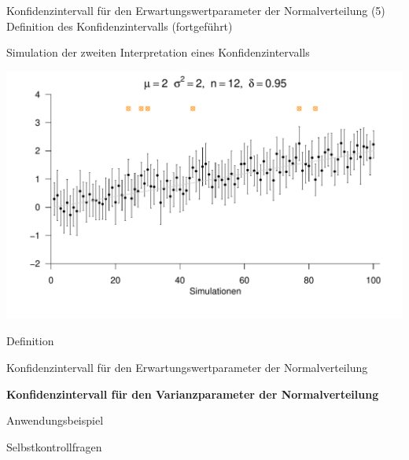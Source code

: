\documentclass[
  8pt,
  ignorenonframetext,
]{beamer}
\begin{document}
\begin{frame}{Konfidenzintervall für den Erwartungswertparameter der
Normalverteilung}
\protect\hypertarget{konfidenzintervall-fuxfcr-den-erwartungswertparameter-der-normalverteilung-9}{}
\noindent(5) Definition des Konfidenzintervalls (fortgeführt)

\small

Simulation der zweiten Interpretation eines Konfidenzintervalls

\vspace{3mm}

\begin{center}\includegraphics[width=0.9\linewidth]{11_Abbildungen/wtfi_11_ki_normal_sigsqr_unbekannt_mu_variabel} \end{center}
\end{frame}

\begin{frame}{}
\protect\hypertarget{section-8}{}
\large

Definition

Konfidenzintervall für den Erwartungswertparameter der Normalverteilung

\textbf{Konfidenzintervall für den Varianzparameter der
Normalverteilung}

Anwendungsbeispiel

Selbstkontrollfragen
\end{frame}
\end{document}
